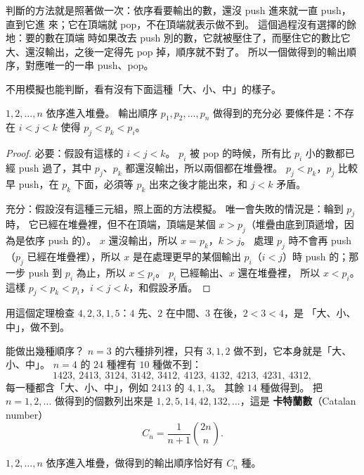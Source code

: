判斷的方法就是照著做一次：依序看要輸出的數，還沒 push 進來就一直 push，直到它進
來；它在頂端就 pop，不在頂端就表示做不到。 這個過程沒有選擇的餘地：要的數在頂端
時如果改去 push 別的數，它就被壓住了，而壓住它的數比它大、還沒輸出，之後一定得先
pop 掉，順序就不對了。 所以一個做得到的輸出順序，對應唯一的一串 push、pop。

不用模擬也能判斷，看有沒有下面這種「大、小、中」的樣子。

\begin{theorem}
\label{thm:sq-312}
$1, 2, \ldots, n$ 依序進入堆疊。 輸出順序 $p_1, p_2, \ldots, p_n$ 做得到的充分必
要條件是：不存在 $i < j < k$ 使得 $p_j < p_k < p_i$。
\end{theorem}

\begin{proof}
必要：假設有這樣的 $i < j < k$。 $p_i$ 被 pop 的時候，所有比 $p_i$ 小的數都已經
push 過了，其中 $p_j$、$p_k$ 都還沒輸出，所以兩個都在堆疊裡。 $p_j < p_k$，$p_j$
比較早 push，在 $p_k$ 下面，必須等 $p_k$ 出來之後才能出來，和 $j < k$ 矛盾。

充分：假設沒有這種三元組，照上面的方法模擬。 唯一會失敗的情況是：輪到 $p_j$ 時，
它已經在堆疊裡，但不在頂端，頂端是某個 $x > p_j$（堆疊由底到頂遞增，因為是依序
push 的）。 $x$ 還沒輸出，所以 $x = p_k$，$k > j$。 處理 $p_j$ 時不會再 push
（$p_j$ 已經在堆疊裡），所以 $x$ 是在處理更早的某個輸出 $p_i$（$i < j$）時 push
的；那一步 push 到 $p_i$ 為止，所以 $x \le p_i$。 $p_i$ 已經輸出、$x$ 還在堆疊裡，
所以 $x < p_i$。 這樣 $p_j < p_k < p_i$，$i < j < k$，和假設矛盾。
\end{proof}

用這個定理檢查 $4, 2, 3, 1, 5$：$4$ 先、$2$ 在中間、$3$ 在後，$2 < 3 < 4$，是
「大、小、中」，做不到。

能做出幾種順序？ $n = 3$ 的六種排列裡，只有 $3, 1, 2$ 做不到，它本身就是「大、
小、中」。 $n = 4$ 的 $24$ 種裡有 $10$ 種做不到：
\[
1423,\ 2413,\ 3124,\ 3142,\ 3412,\ 4123,\ 4132,\ 4213,\ 4231,\ 4312,
\]
每一種都含「大、小、中」，例如 $2413$ 的 $4, 1, 3$。 其餘 $14$ 種做得到。 把
$n = 1, 2, \ldots$ 做得到的個數列出來是 $1, 2, 5, 14, 42, 132, \ldots$，這是
\textbf{卡特蘭數}（Catalan number）
\[
C_n = \frac{1}{n+1}\binom{2n}{n}.
\]

\begin{theorem}
\label{thm:sq-catalan}
$1, 2, \ldots, n$ 依序進入堆疊，做得到的輸出順序恰好有 $C_n$ 種。
\end{theorem}

